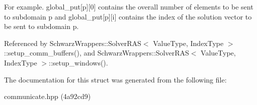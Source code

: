 For example. global\+\_\+put\mbox{[}p\mbox{]}\mbox{[}0\mbox{]} contains the overall number of elements to be sent to subdomain p and global\+\_\+put\mbox{[}p\mbox{]}\mbox{[}i\mbox{]} contains the index of the solution vector to be sent to subdomain p. 

Referenced by Schwarz\+Wrappers\+::\+Solver\+R\+A\+S$<$ Value\+Type, Index\+Type $>$\+::setup\+\_\+comm\+\_\+buffers(), and Schwarz\+Wrappers\+::\+Solver\+R\+A\+S$<$ Value\+Type, Index\+Type $>$\+::setup\+\_\+windows().



The documentation for this struct was generated from the following file\+:\begin{DoxyCompactItemize}
\item 
communicate.\+hpp (4a92cd9)\end{DoxyCompactItemize}
